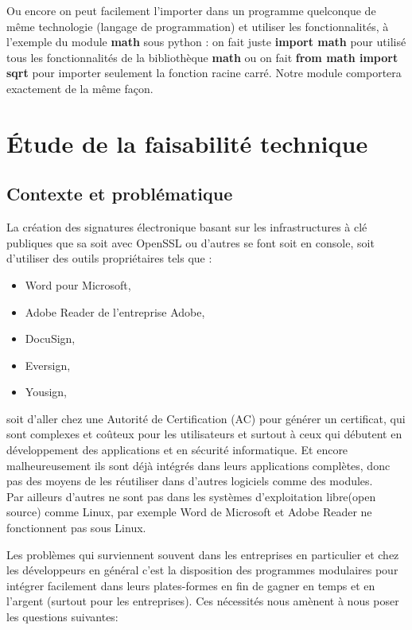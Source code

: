 \documentclass[12pt,a4paper]{article}
\begin{document}
	 Ou encore on peut facilement l'importer dans un programme quelconque de même technologie (langage de programmation) et utiliser les fonctionnalités, à l'exemple du module \textbf{math} sous python : on fait juste \textbf{import math} pour utilisé tous les fonctionnalités de la bibliothèque \textbf{math} ou on fait \textbf{from math import sqrt } pour importer seulement la fonction racine carré. Notre module comportera exactement de la même façon.

\section{Étude de la faisabilité technique}
	\subsection{Contexte et problématique} 
	
		La création des signatures électronique basant sur les infrastructures à clé publiques que sa soit avec OpenSSL ou d'autres se font soit en console, soit d'utiliser des outils propriétaires tels que :
		\begin{itemize}
			\item Word pour Microsoft,
			\item Adobe Reader de l'entreprise Adobe,
			\item DocuSign,
			\item Eversign,
			\item Yousign,\\
		\end{itemize}
		
		soit d'aller chez une Autorité de Certification (AC) pour générer un certificat, qui sont complexes et coûteux pour les utilisateurs et surtout à ceux qui débutent en développement des applications et en sécurité informatique. Et encore malheureusement ils sont déjà intégrés dans leurs applications complètes, donc pas des moyens de les réutiliser dans  d'autres logiciels comme des modules.\\
		
		Par ailleurs d'autres ne sont pas dans les systèmes d'exploitation libre(open source) comme Linux, par exemple Word de Microsoft et Adobe Reader ne fonctionnent pas sous Linux. 
		
		\newpage
		
		Les problèmes qui surviennent souvent dans les entreprises en particulier et chez les développeurs en général c'est la disposition des programmes modulaires pour intégrer facilement dans leurs plates-formes en fin de gagner en temps et en l'argent (surtout pour les entreprises). Ces nécessités nous amènent à nous poser les questions suivantes:\\
		
\end{document}
